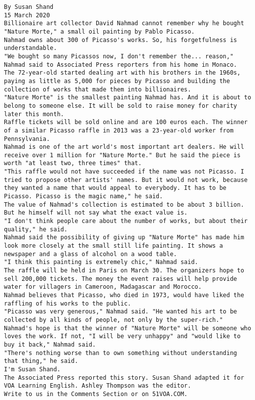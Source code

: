 %
\begin{lstlisting}[]
By Susan Shand
15 March 2020
Billionaire art collector David Nahmad cannot remember why he bought "Nature Morte," a small oil painting by Pablo Picasso.
Nahmad owns about 300 of Picasso's works. So, his forgetfulness is understandable.
"We bought so many Picassos now, I don't remember the... reason," Nahmad said to Associated Press reporters from his home in Monaco.
The 72-year-old started dealing art with his brothers in the 1960s, paying as little as 5,000 for pieces by Picasso and building the collection of works that made them into billionaires.
"Nature Morte" is the smallest painting Nahmad has. And it is about to belong to someone else. It will be sold to raise money for charity later this month.
Raffle tickets will be sold online and are 100 euros each. The winner of a similar Picasso raffle in 2013 was a 23-year-old worker from Pennsylvania.
Nahmad is one of the art world's most important art dealers. He will receive over 1 million for "Nature Morte." But he said the piece is worth "at least two, three times" that.
"This raffle would not have succeeded if the name was not Picasso. I tried to propose other artists' names. But it would not work, because they wanted a name that would appeal to everybody. It has to be Picasso. Picasso is the magic name," he said.
The value of Nahmad's collection is estimated to be about 3 billion. But he himself will not say what the exact value is.
"I don't think people care about the number of works, but about their quality," he said.
Nahmad said the possibility of giving up "Nature Morte" has made him look more closely at the small still life painting. It shows a newspaper and a glass of alcohol on a wood table.
"I think this painting is extremely chic," Nahmad said.
The raffle will be held in Paris on March 30. The organizers hope to sell 200,000 tickets. The money the event raises will help provide water for villagers in Cameroon, Madagascar and Morocco.
Nahmad believes that Picasso, who died in 1973, would have liked the raffling of his works to the public.
"Picasso was very generous," Nahmad said. "He wanted his art to be collected by all kinds of people, not only by the super-rich."
Nahmad's hope is that the winner of "Nature Morte" will be someone who loves the work. If not, "I will be very unhappy" and "would like to buy it back," Nahmad said.
"There's nothing worse than to own something without understanding that thing," he said.
I'm Susan Shand.
The Associated Press reported this story. Susan Shand adapted it for VOA Learning English. Ashley Thompson was the editor.
Write to us in the Comments Section or on 51VOA.COM.


\end{lstlisting}
